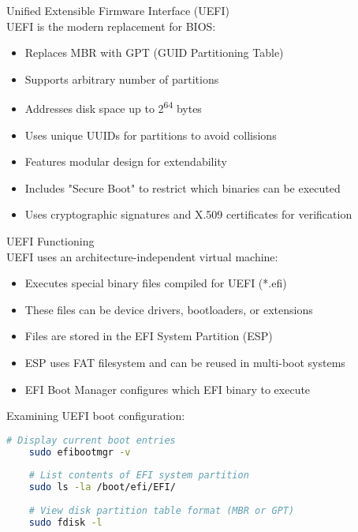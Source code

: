 \begin{definition}{Unified Extensible Firmware Interface (UEFI)}\\
    UEFI is the modern replacement for BIOS:
    \begin{itemize}
        \item Replaces MBR with GPT (GUID Partitioning Table)
        \item Supports arbitrary number of partitions
        \item Addresses disk space up to 2\textsuperscript{64} bytes
        \item Uses unique UUIDs for partitions to avoid collisions
        \item Features modular design for extendability
        \item Includes "Secure Boot" to restrict which binaries can be executed
        \item Uses cryptographic signatures and X.509 certificates for verification
    \end{itemize}
\end{definition}

\begin{definition}{UEFI Functioning}\\
    UEFI uses an architecture-independent virtual machine:
    \begin{itemize}
        \item Executes special binary files compiled for UEFI (*.efi)
        \item These files can be device drivers, bootloaders, or extensions
        \item Files are stored in the EFI System Partition (ESP)
        \item ESP uses FAT filesystem and can be reused in multi-boot systems
        \item EFI Boot Manager configures which EFI binary to execute
    \end{itemize}
\end{definition}

\begin{example}
    Examining UEFI boot configuration:
    \begin{lstlisting}[language=bash, style=basesmol]
    # Display current boot entries
    sudo efibootmgr -v
    
    # List contents of EFI system partition
    sudo ls -la /boot/efi/EFI/
    
    # View disk partition table format (MBR or GPT)
    sudo fdisk -l
    \end{lstlisting}
\end{example}

